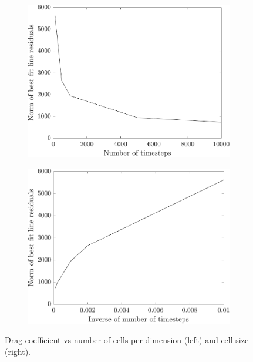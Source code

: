 \begin{figure}
    \centering
    \begin{subfigure}{0.49\textwidth}
        \centering
        \includegraphics[width=\textwidth]{Images/3. Methodology/Timestep average convergence/rests.pdf}
    \end{subfigure}
    \hfill
    \begin{subfigure}{0.49\textwidth}
        \centering
        \includegraphics[width=\textwidth]{Images/3. Methodology/Timestep average convergence/resinvts.pdf}
    \end{subfigure}
    \caption{Drag coefficient vs number of cells per dimension (left) and cell size (right).}
    \label{fig:averesid}
\end{figure}

